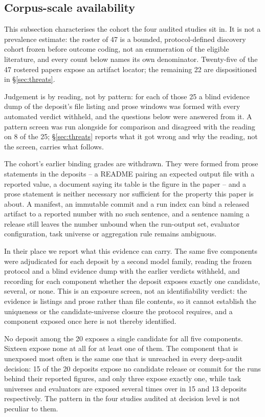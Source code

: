 \subsection{Corpus-scale availability}
\label{sec:results:corpus}

This subsection characterises the cohort the four audited studies sit in. It is not a
prevalence estimate: the roster of 47 is a bounded, protocol-defined discovery cohort frozen
before outcome coding, not an enumeration of the eligible literature, and every count below
names its own denominator. Twenty-five of the 47 rostered papers expose an artifact locator;
the remaining 22 are dispositioned in \S\ref{sec:threats}.

Judgement is by reading, not by pattern: for each of those 25 a blind evidence dump of the
deposit's file listing and prose windows was formed with every automated verdict withheld,
and the questions below were answered from it. A pattern screen was run alongside for
comparison and disagreed with the reading on 8 of the 25; \S\ref{sec:threats} reports what
it got wrong and why the reading, not the screen, carries what follows.

The cohort's earlier binding grades are withdrawn. They were formed from prose statements in
the deposits -- a README pairing an expected output file with a reported value, a document
saying its table is the figure in the paper -- and a prose statement is neither necessary nor
sufficient for the property this paper is about. A manifest, an immutable commit and a run
index can bind a released artifact to a reported number with no such sentence, and a sentence
naming a release still leaves the number unbound when the run-output set, evaluator
configuration, task universe or aggregation rule remains ambiguous.

In their place we report what this evidence can carry. The same five components were
adjudicated for each deposit by a second model family, reading the frozen protocol and a blind
evidence dump with the earlier verdicts withheld, and recording for each component whether the
deposit exposes exactly one candidate, several, or none. This is an exposure screen, not an
identifiability verdict: the evidence is listings and prose rather than file contents, so it
cannot establish the uniqueness or the candidate-universe closure the protocol requires, and a
component exposed once here is not thereby identified.

No deposit among the 20 exposes a single candidate for all five components. Sixteen expose
none at all for at least one of them. The component that is unexposed most often is the same
one that is unreached in every deep-audit decision: 15 of the 20 deposits expose no candidate
release or commit for the runs behind their reported figures, and only three expose exactly
one, while task universes and evaluators are exposed several times over in 15 and 13 deposits
respectively. The pattern in the four studies audited at
decision level is not peculiar to them.

